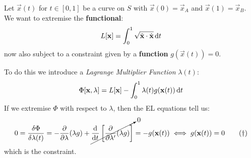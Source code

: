 \documentclass[../main.tex]{subfiles}
\begin{document}
Let $\vec{x}(t)$ for $t \in [0, 1]$ be a curve on $S$ with $\vec{x}(0) = \vec{x}_A$ and $\vec{x}(1) = \vec{x}_B$.
We want to extremise the \textbf{functional}:
\[
  L[\vec{x}] = \int_{0}^{1} \sqrt{\dot{\vec{x}} \cdot \dot{ \vec{x}}} \d{t}
\]
now also subject to a constraint given by a \textbf{function} $g(\vec{x}(t)) = 0$.

To do this we introduce a \textit{Lagrange Multiplier Function} $\lambda(t)$:
\[
  \Phi[\vec{x}, \lambda] = L[\vec{x}] - \int_{0}^{1} \lambda(t) g(\vec{x}(t)) \d{t}
\]
If we extremise $\Phi$ with respect to $\lambda$, then the EL equations tell us:
\begin{equation}
  0 = \frac{\delta \Phi}{\delta \lambda(t)} = - \pderiv{}{\lambda}(\lambda g) + \cancelto{0}{\deriv{}{t}\left[\pderiv{}{\lambda'}(\lambda g)\right]} = - g(\vec{x}(t)) \iff g(\vec{x}(t)) = 0 \tag{$\dag$} \label{lExtremeGeo}
\end{equation}
which is the constraint.
\end{document}
